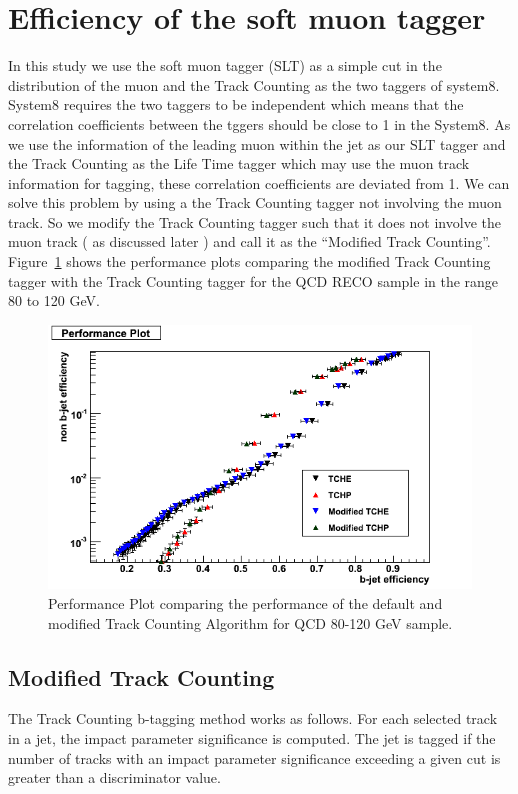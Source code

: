 \section{Efficiency of the soft muon tagger}

In this study we use the soft muon tagger (SLT) as a simple cut in the \ptrel distribution of
the muon and the Track Counting  as the two taggers of system8. System8 
requires the two taggers to be independent which means that the correlation 
coefficients between the tggers should be close to 1 in the System8. As we use 
the \ptrel information of the leading muon within the jet as our SLT tagger 
and the Track Counting as the Life Time tagger  which may use the muon track 
information for tagging, these correlation coefficients are deviated from 1.
We can solve this problem by using a the Track Counting tagger not involving 
the muon track. So we modify the Track Counting tagger such that it does not 
involve the muon track ( as discussed later ) and call it as the ``Modified 
Track Counting''. Figure~\ref{fig:Performanceplot} shows the performance plots
 comparing the modified Track Counting tagger with the Track Counting tagger
for the QCD RECO sample in the \pt range 80 to 120 GeV.

\begin{figure}[htbp]
  \begin{center}
    \includegraphics[width=120mm]{Figures/QCD_80_120.png}
  \end{center}
  \caption{Performance Plot comparing the performance of the default and 
modified Track Counting Algorithm for QCD 80-120 GeV sample.}
  \label{fig:Performanceplot}
\end{figure}


\subsection{Modified Track Counting}
\label{sec:MTC}
The Track Counting b-tagging method works as follows. For each selected track
in a jet, the impact parameter significance is computed. The jet is tagged if 
the number of tracks with an impact parameter significance exceeding a given 
cut is greater than a discriminator value.

